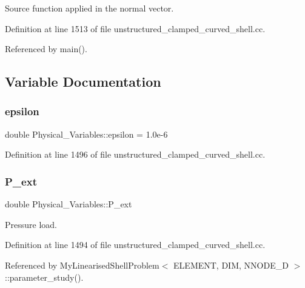 Source function applied in the normal vector. 



Definition at line 1513 of file unstructured\+\_\+clamped\+\_\+curved\+\_\+shell.\+cc.



Referenced by main().



\subsection{Variable Documentation}
\mbox{\label{namespacePhysical__Variables_ac374cc60da0f1e5df3fc48a3c9ce1d74}} 
\subsubsection{\texorpdfstring{epsilon}{epsilon}}
{\footnotesize\ttfamily double Physical\+\_\+\+Variables\+::epsilon = 1.\+0e-\/6}



Definition at line 1496 of file unstructured\+\_\+clamped\+\_\+curved\+\_\+shell.\+cc.

\mbox{\label{namespacePhysical__Variables_a58adc76bae4751599143c613f9100904}} 
\subsubsection{\texorpdfstring{P\+\_\+ext}{P\_ext}}
{\footnotesize\ttfamily double Physical\+\_\+\+Variables\+::\+P\+\_\+ext}



Pressure load. 



Definition at line 1494 of file unstructured\+\_\+clamped\+\_\+curved\+\_\+shell.\+cc.



Referenced by My\+Linearised\+Shell\+Problem$<$ E\+L\+E\+M\+E\+N\+T, D\+I\+M, N\+N\+O\+D\+E\+\_\+D $>$\+::parameter\+\_\+study().

